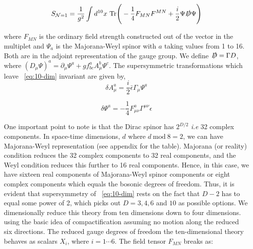\begin{equation}
S_{\mathcal{N} = 1} = \frac{1}{g^2} \int d^{10} x ~ \mathrm{Tr} \Bigg (-\frac{1}{4} F_{MN}F^{MN} +\frac{i}{2} \Psi \slashed{D} \Psi \Bigg) 
\label{eq:10-dim} 
\end{equation}

where $F_{MN}$ is the ordinary field strength constructed out of the vector in the multiplet
and $\Psi_{a}$ is the Majorana-Weyl spinor with $a$ taking values from 1 to 16. Both are in the 
adjoint representation of the gauge group. We define $ \slashed{D} = \Gamma D $, where
$ (D_{\mu} \Psi)^{a} = \partial_{\mu} \Psi^{a} + g f^{a}_{bc} A_{\mu}^{b} \Psi^{c}$. 
The supersymmetric transformations which leave ~\ref{eq:10-dim} invariant are given by, 
\begin{equation}
\delta A_{\mu}^{a} = \frac{i}{2} \bar{\epsilon} \Gamma_{\mu} \Psi^{a} 
\end{equation} 

\begin{equation}
\delta \Psi^{a} = -\frac{1}{4}F_{\mu\nu}^{a} \Gamma^{\mu \nu} \epsilon
\end{equation}


One important point to note is that the Dirac spinor has $2^{D/2}$ \emph{i.e} 32 complex components. 
In space-time dimensions, $d$ where $ d ~ \text{mod} ~ 8 = 2$, we can have 
Majorana-Weyl representation (see appendix for the table). Majorana (or reality) condition reduces the 
32 complex components to 32 real components, and the Weyl condition reduces this further to 16 real components. 
Hence, in this case, we have sixteen real components of Majorana-Weyl spinor components or eight complex components
which equals the bosonic degrees of freedom. Thus, it is evident that supersymmetry of ~\ref{eq:10-dim} rests on the fact
that $D-2$ has to equal some power of 2, which picks out $D=3,4,6$ and $10$ as possible options. 
We dimensionally reduce this theory from ten dimensions down to four dimensions. 
using the basic idea of compactification assuming no motion along the reduced six directions. 
The reduced gauge degrees of freedom the ten-dimensional theory 
behaves as scalars $X_{i}$, where $ i = 1 \cdots 6$. 
The field tensor $F_{MN}$ breaks as: 


